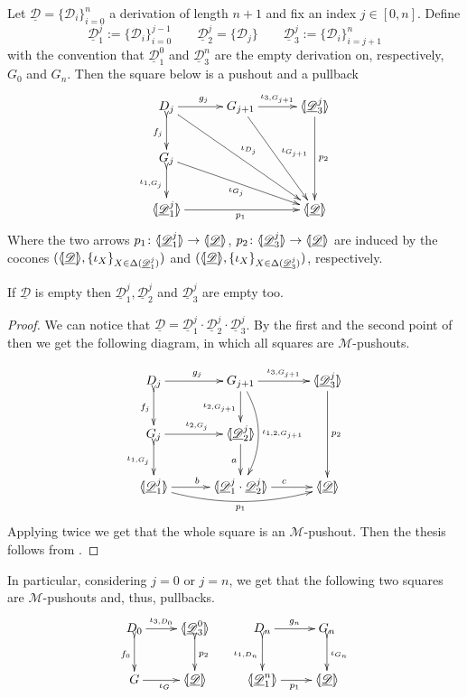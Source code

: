 \documentclass[a4paper,UKenglish,cleveref,pdftex, thm-restate,numberwithinsect]{lipics}
\newcommand{\dder}[1]{\mathscr{#1}}
\newcommand{\der}[1]{\underline{\dder{#1}}}
\newcommand{\lpro}{\langle \hspace{-1.85pt}[}
\newcommand{\rpro}{]\hspace{-1.85pt}\rangle}
\newcommand{\tpro}[1]{\lpro \der{#1}\rpro}
\begin{document}
\begin{corollary}\label{cor:colim}
Let $\der{D}=\{\dder{D}_i\}_{i=0}^n$ a derivation of length $n+1$ and fix an index $j\in[0,n]$. Define
\[\der{D}^j_1:=\{\dder{D}_i\}_{i=0}^{j-1} \qquad  \der{D}^j_2=\{\dder{D}_j\} \qquad \der{D}^j_3:=\{\dder{D}_i\}_{i=j+1}^n\]
with the convention that $\der{D}^0_1$ and $\der{D}^n_3$ are the empty derivation on, respectively, $G_0$ and $G_n$. Then the square below is a pushout and a pullback
\[\xymatrix@C=30pt{D_{j} \ar[ddrr]^{\iota_{D_j}} \ar[r]^{g_j}\ar@{>->}[d]_{f_j}& G_{j+1} \ar[ddr]^{\iota_{G_{j+1}}} \ar[r]^-{\iota_{3, G_{j+1}}} & \lpro \der{D}^j_3\rpro \ar[dd]^{p_2} \\ G_j\ar[drr]_{\iota_{G_{j}}} \ar@{>->}[d]_{\iota_{1,G_j}}\\ \lpro \der{D}^j_1 \rpro \ar[rr]_{p_1}  &&\tpro{D} }\] 
Where the two arrows $p_1\colon \lpro\der{D}^j_1 \rpro\to \tpro{D}$, $p_2\colon \lpro \der{D}^j_3\rpro \to \tpro{D}$ are induced by the cocones $(\tpro{D}, \{\iota_{X}\}_{X\in \Delta(\der{D}^j_1)})$ and $(\tpro{D}, \{\iota_{X}\}_{X\in \Delta(\der{D}^j_3)})$, respectively.
\end{corollary}
\begin{remark}
If $\der{D}$ is empty then $\der{D}^j_1, \der{D}^j_2$ and $\der{D}^j_3$ are empty too.
\end{remark}
\begin{proof}
We can notice that $\der{D}=\der{D}^j_1\cdot \der{D}^j_2 \cdot \der{D}^j_3$. By the first and the second point of  then we get the following diagram, in which all squares are $\mathcal{M}$-pushouts.

\[\xymatrix@C=30pt{D_{j}  \ar[r]^{g_j}\ar@{>->}[d]_{f_j}& G_{j+1}  \ar[r]^-{\iota_{3,G_{j+1}}} \ar[d]_{\iota_{2, G_{j+1}}}  \ar@/^.5cm/[dd]^{\iota_{1,2, G_{j+1}}}& \lpro \der{D}^j_3\rpro \ar[dd]^{p_2} \\ G_j \ar[r]^{\iota_{2, G_j}}\ar@{>->}[d]_{\iota_{1,G_j}} & \lpro \der{D}^j_2\rpro \ar[d]_a\\ \lpro \der{D}^j_1 \rpro \ar@/_.4cm/[rr]_{p_1} \ar[r]^b &\lpro \der{D}^j_1\cdot \der{D}^j_2 \rpro \ar[r]^c&\tpro{D} }\] 
Applying  twice we get that the whole square is an $\mathcal{M}$-pushout. Then the thesis follows from .
\end{proof}

\begin{remark}\label{rem:zero1} In particular, considering $j=0$ or $j=n$, we get that the following two squares are $\mathcal{M}$-pushouts and, thus, pullbacks.
	\[\xymatrix{D_0 \ar[r]^-{\iota_{3, D_0}} \ar@{>->}[d]_{f_0}& \lpro \der{D}^0_3 \rpro \ar@{>->}[d]^{p_2} &D_n \ar@{>->}[d]_{\iota_{1, D_n}}\ar[r]^{g_n}& G_n \ar@{>->}[d]^{\iota_{G_n}}\\ G \ar[r]_{\iota_G}& \tpro{D} & \lpro \der{D}^n_1 \rpro \ar[r]_{p_1}  & \tpro{D}}\]
\end{remark}
\end{document}
